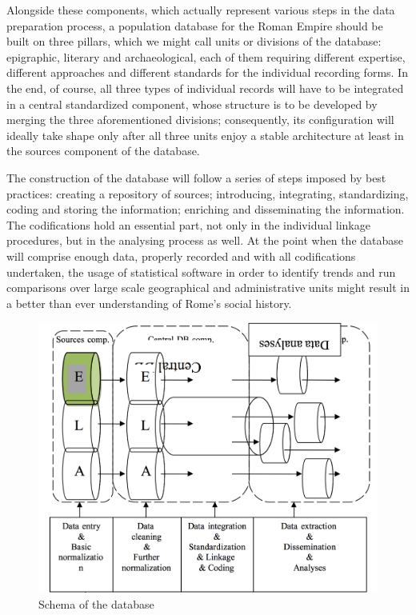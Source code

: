 \documentclass[amsthm,ebook]{saparticle}
\begin{document}
Alongside these components, which actually represent various steps in the data preparation process, a population
database for the Roman Empire should be built on three pillars, which we might call units or divisions of the database:
epigraphic, literary and archaeological, each of them requiring different expertise, different approaches and different
standards for the individual recording forms. In the end, of course, all three types of individual records will have to
be integrated in a central standardized component, whose structure is to be developed by merging the three
aforementioned divisions; consequently, its configuration will ideally take shape only after all three units enjoy a
stable architecture at least in the sources component of the database.

The construction of the database will follow a series of steps imposed by best practices: creating a repository of
sources; introducing, integrating, standardizing, coding and storing the information; enriching and disseminating the
information. The codifications hold an essential part, not only in the individual linkage procedures, but in the
analysing process as well. At the point when the database will comprise enough data, properly recorded and with all
codifications undertaken, the usage of statistical software in order to identify trends and run comparisons over large
scale geographical and administrative units might result in a better than ever understanding of Rome’s
social history.


\begin{figure}[!bp]
\centering
\includegraphics[scale=0.50]{1.png}
\caption{Schema of the database}
\label{fig:schemadatabase}
\end{figure}
\end{document}
